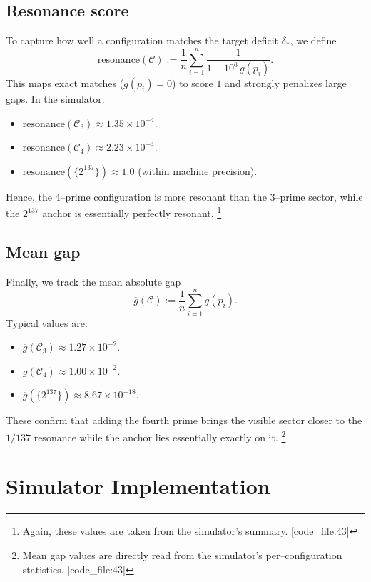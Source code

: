 \documentclass[11pt]{article}
\begin{document}
\subsection{Resonance score}

To capture how well a configuration matches the target deficit $\delta_\ast$, we define
\begin{equation}
  \mathrm{resonance}(\mathcal{C}) 
    := \frac{1}{n}\sum_{i=1}^n \frac{1}{1 + 10^6\, g(p_i)}.
\end{equation}
This maps exact matches ($g(p_i)=0$) to score $1$ and strongly penalizes large gaps. In the simulator:
\begin{itemize}
  \item $\mathrm{resonance}(\mathcal{C}_3) \approx 1.35\times 10^{-4}$.
  \item $\mathrm{resonance}(\mathcal{C}_4) \approx 2.23\times 10^{-4}$.
  \item $\mathrm{resonance}(\{2^{137}\}) \approx 1.0$ (within machine precision).
\end{itemize}
Hence, the 4--prime configuration is more resonant than the 3--prime sector, while the $2^{137}$ anchor is essentially perfectly resonant.%
\footnote{Again, these values are taken from the simulator’s summary. [code\_file:43]} 

\subsection{Mean gap}

Finally, we track the mean absolute gap
\begin{equation}
  \overline{g}(\mathcal{C}) := \frac{1}{n}\sum_{i=1}^n g(p_i).
\end{equation}
Typical values are:
\begin{itemize}
  \item $\overline{g}(\mathcal{C}_3) \approx 1.27\times 10^{-2}$.
  \item $\overline{g}(\mathcal{C}_4) \approx 1.00\times 10^{-2}$.
  \item $\overline{g}(\{2^{137}\}) \approx 8.67\times 10^{-18}$.
\end{itemize}
These confirm that adding the fourth prime brings the visible sector closer to the $1/137$ resonance while the anchor lies essentially exactly on it.%
\footnote{Mean gap values are directly read from the simulator’s per--configuration statistics. [code\_file:43]} 

\section{Simulator Implementation}
\label{sec:code-snippet}
\end{document}
